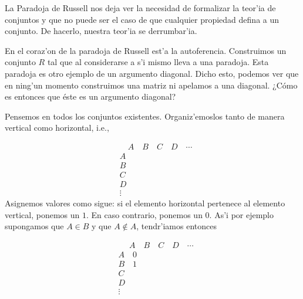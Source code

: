 La Paradoja de Russell nos deja ver la necesidad de formalizar la teor'ia de conjuntos y que no puede ser el caso de que cualquier propiedad defina a un conjunto. De hacerlo, nuestra teor'ia se derrumbar'ia. 

En el coraz'on de la paradoja de Russell est'a la autoferencia. Construimos un conjunto $R$ tal que al considerarse a s'i mismo lleva a una paradoja. Esta paradoja es otro ejemplo de un argumento diagonal. Dicho esto, podemos ver que en ning'un momento construimos una matriz ni apelamos a una diagonal. ¿Cómo es entonces que éste es un argumento diagonal? 

Pensemos en todos los conjuntos existentes. Organiz'emoslos tanto de manera vertical como horizontal, i.e., 

\begin{align*}
    &\quad A\quad B \quad C \quad D \quad \cdots\\
    &A\\
    &B\\
    &C\\
    &D\\
    &\vdots
\end{align*}
Asignemos valores como sigue: si el elemento horizontal pertenece al elemento vertical, ponemos un $1$. En caso contrario, ponemos un $0$. As'i por ejemplo supongamos que $A\in B$ y que $A\notin A$, tendr'iamos entonces 

\begin{align*}
    &\,\,\quad A\quad B \quad C \quad D \quad \cdots\\
    &A\quad 0\\
    &B\quad 1\\
    &C\\
    &D\\
    &\vdots
\end{align*}

